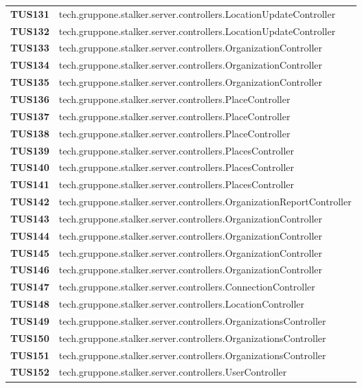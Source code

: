 \documentclass[../../piano-di-qualifica.tex]{subfiles}
\begin{document}
\begin{longtable}[H]{>{\centering\bfseries}m{3cm} >{}m{13cm}}

  TUS131 & tech.gruppone.stalker.server.controllers.LocationUpdateController \\
  TUS132 & tech.gruppone.stalker.server.controllers.LocationUpdateController \\
  TUS133 & tech.gruppone.stalker.server.controllers.OrganizationController \\
  TUS134 & tech.gruppone.stalker.server.controllers.OrganizationController \\
  TUS135 & tech.gruppone.stalker.server.controllers.OrganizationController \\
  TUS136 & tech.gruppone.stalker.server.controllers.PlaceController \\
  TUS137 & tech.gruppone.stalker.server.controllers.PlaceController \\
  TUS138 & tech.gruppone.stalker.server.controllers.PlaceController \\
  TUS139 & tech.gruppone.stalker.server.controllers.PlacesController \\
  TUS140 & tech.gruppone.stalker.server.controllers.PlacesController \\
  TUS141 & tech.gruppone.stalker.server.controllers.PlacesController \\
  TUS142 & tech.gruppone.stalker.server.controllers.OrganizationReportController \\
  TUS143 & tech.gruppone.stalker.server.controllers.OrganizationController \\
  TUS144 & tech.gruppone.stalker.server.controllers.OrganizationController \\
  TUS145 & tech.gruppone.stalker.server.controllers.OrganizationController \\
  TUS146 & tech.gruppone.stalker.server.controllers.OrganizationController \\
  TUS147 & tech.gruppone.stalker.server.controllers.ConnectionController \\
  TUS148 & tech.gruppone.stalker.server.controllers.LocationController \\
  TUS149 & tech.gruppone.stalker.server.controllers.OrganizationsController \\
  TUS150 & tech.gruppone.stalker.server.controllers.OrganizationsController \\
  TUS151 & tech.gruppone.stalker.server.controllers.OrganizationsController \\
  TUS152 & tech.gruppone.stalker.server.controllers.UserController \\

\end{longtable}
\end{document}
